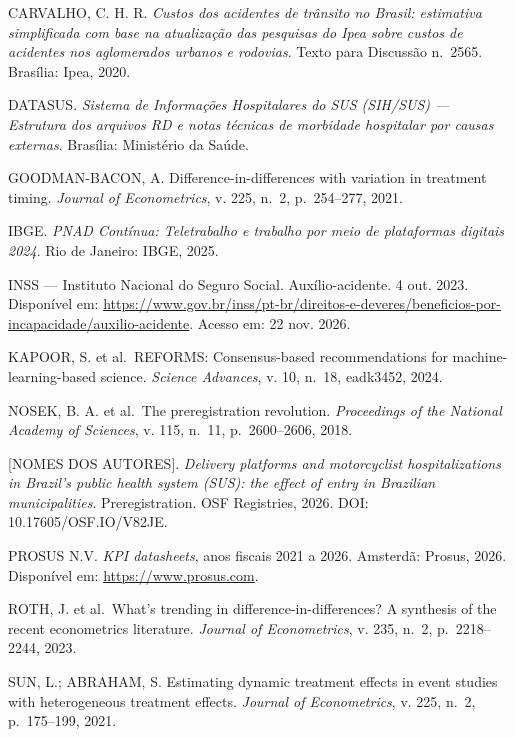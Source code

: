 \documentclass[
  11pt,
]{article}
\begin{document}
CARVALHO, C. H. R. \emph{Custos dos acidentes de trânsito no Brasil: estimativa simplificada com base na atualização das pesquisas do Ipea sobre custos de acidentes nos aglomerados urbanos e rodovias}. Texto para Discussão n.~2565. Brasília: Ipea, 2020.

DATASUS. \emph{Sistema de Informações Hospitalares do SUS (SIH/SUS) --- Estrutura dos arquivos RD e notas técnicas de morbidade hospitalar por causas externas}. Brasília: Ministério da Saúde.

GOODMAN-BACON, A. Difference-in-differences with variation in treatment timing. \emph{Journal of Econometrics}, v. 225, n.~2, p.~254--277, 2021.

IBGE. \emph{PNAD Contínua: Teletrabalho e trabalho por meio de plataformas digitais 2024}. Rio de Janeiro: IBGE, 2025.

INSS --- Instituto Nacional do Seguro Social. Auxílio-acidente. 4 out. 2023. Disponível em: \url{https://www.gov.br/inss/pt-br/direitos-e-deveres/beneficios-por-incapacidade/auxilio-acidente}. Acesso em: 22 nov. 2026.

KAPOOR, S. et al.~REFORMS: Consensus-based recommendations for machine-learning-based science. \emph{Science Advances}, v. 10, n.~18, eadk3452, 2024.

NOSEK, B. A. et al.~The preregistration revolution. \emph{Proceedings of the National Academy of Sciences}, v. 115, n.~11, p.~2600--2606, 2018.

{[}NOMES DOS AUTORES{]}. \emph{Delivery platforms and motorcyclist hospitalizations in Brazil's public health system (SUS): the effect of entry in Brazilian municipalities}. Preregistration. OSF Registries, 2026. DOI: 10.17605/OSF.IO/V82JE.

PROSUS N.V. \emph{KPI datasheets}, anos fiscais 2021 a 2026. Amsterdã: Prosus, 2026. Disponível em: \url{https://www.prosus.com}.

ROTH, J. et al.~What's trending in difference-in-differences? A synthesis of the recent econometrics literature. \emph{Journal of Econometrics}, v. 235, n.~2, p.~2218--2244, 2023.

SUN, L.; ABRAHAM, S. Estimating dynamic treatment effects in event studies with heterogeneous treatment effects. \emph{Journal of Econometrics}, v. 225, n.~2, p.~175--199, 2021.
\end{document}
